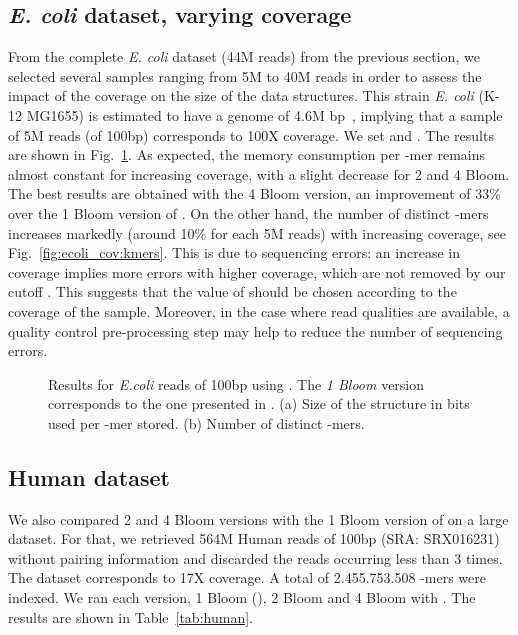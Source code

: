 \documentclass[pdftex]{llncs}\usepackage[T1]{fontenc}
\begin{document}
\subsection{\emph{E. coli} dataset, varying coverage} \label{subsec:cov}
From the complete \emph{E. coli} dataset (44M reads) from
the previous section, we selected several samples ranging from 5M to 40M
reads in order to assess the impact of the coverage on the size of the
data structures. This strain \emph{E. coli} (K-12 MG1655) is estimated to
have a genome of 4.6M bp~\cite{ecoli}, implying that a sample of 5M
reads (of 100bp) corresponds to 100X coverage. We
set  and . The results are shown in
Fig.~\ref{fig:ecoli_coverage}. As expected, the 
memory consumption per -mer
remains almost constant for increasing 
coverage, with a slight decrease for 2 and 4 Bloom. The best
results are obtained with the 4 Bloom version, an improvement of 33\%
over the 1 Bloom version of \cite{DBLP:conf/wabi/ChikhiR12}. On the other hand, the number of distinct -mers 
increases markedly (around 10\% for each 5M reads) with increasing coverage, see Fig.~\ref{fig:ecoli_cov:kmers}. 
This is due to
sequencing errors: an increase in coverage implies more errors with
higher coverage, which are not removed by our cutoff
. This suggests that the value of  should be chosen
according to the coverage of the sample. Moreover, in the case where
read qualities are available, a quality control pre-processing step may
help to reduce the number of sequencing errors.

\begin{figure}[Htbp]
  \center 
  \caption{Results for \emph{E.coli} reads of 100bp using . The \emph{1 Bloom} version corresponds to the one presented
    in \cite{DBLP:conf/wabi/ChikhiR12}. (a) Size of the structure in
    bits used per -mer stored. (b) Number of distinct -mers.}\label{fig:ecoli_coverage}
\end{figure}

\subsection{Human dataset}
\label{human}
We also compared 2 and 4 Bloom versions with the 1 Bloom version of
\cite{DBLP:conf/wabi/ChikhiR12} on a large dataset. For that, we
retrieved 564M Human reads of 100bp (SRA: SRX016231) without pairing
information and
discarded the reads occurring less than 3 times.  The dataset
corresponds to 17X coverage. A total of 2.455.753.508
-mers were indexed. We ran each version, 1 Bloom
(\cite{DBLP:conf/wabi/ChikhiR12}), 2 Bloom and 4 Bloom with . The results are shown in Table~\ref{tab:human}.
\end{document}
